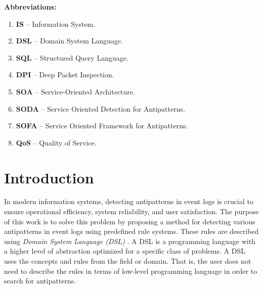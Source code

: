 \documentclass[12pt, times]{article}
\begin{document}
		\textbf{Abbreviations:}
		\begin{enumerate}
			\item \textbf{IS} -- Information System.
			\item \textbf{DSL} -- Domain System Language.
			\item  \textbf{SQL} -- Structured Query Language.
			\item \textbf{DPI} -- Deep Packet Inspection.
			\item \textbf{SOA} -- Service-Oriented Architecture.
			\item \textbf{SODA} -- Service Oriented Detection for Antipatterns.
			\item \textbf{SOFA} -- Service Oriented Framework for Antipatterns.
			\item \textbf{QoS} -- Quality of Service.
		\end{enumerate}
\clearpage

\section*{Introduction}

	\hspace{5mm}In modern information systems, detecting antipatterns in event logs is crucial to ensure operational efficiency, system reliability, and user satisfaction. The purpose of this work is to solve this problem by proposing a method for detecting various antipatterns in event logs using predefined rule systems. These rules are described using \textit{Domain System Language (DSL)} \cite{dsl}. A DSL is a programming language with a higher level of abstraction optimized for a specific class of problems. A DSL uses the concepts and rules from the field or domain. That is, the user does not need to describe the rules in terms of low-level programming language in order to search for antipatterns.
	
\end{document}
